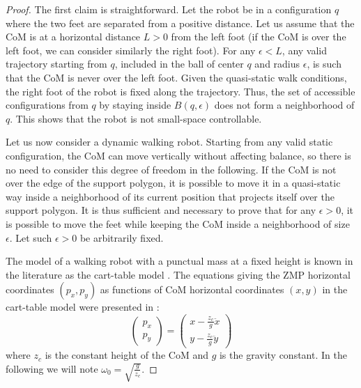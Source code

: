 \documentclass{article}
\begin{document}
\begin{proof}

The first claim is straightforward. Let the robot be in a configuration $q$ where the two
feet are separated from a positive distance. Let us assume that the CoM is at a horizontal
distance $L>0$ from the left foot (if the CoM is over the left foot, we can consider similarly 
the right foot). For any $\epsilon < L$, any valid trajectory starting from $q$, included in
the ball of center $q$ and radius $\epsilon$, is such that the CoM is never over the left foot.
Given the quasi-static walk conditions, the right foot of the robot is fixed along 
the trajectory. Thus, the set of accessible configurations from $q$ by staying inside 
$B(q,\epsilon)$ does not form a neighborhood of $q$. This shows that the robot is 
not small-space controllable.

\bigskip

Let us now consider a dynamic walking robot. Starting from any valid static configuration, 
the CoM can move vertically without affecting balance, so there is no need to 
consider this degree of freedom in the following. If the CoM is not over the edge of the support
polygon, it is possible to move it in a quasi-static way inside a neighborhood of its current position that projects itself over the support polygon. 
It is thus sufficient and necessary to prove that for any $\epsilon >0$, it is possible to move
the feet while keeping the CoM inside a neighborhood of size $\epsilon$. Let such $\epsilon >0$
be arbitrarily fixed.


The model of a walking robot with a punctual
mass at a fixed height is known in the literature as the cart-table model \cite{kajita2003biped}.
The equations  giving  the   ZMP  horizontal  coordinates  $(p_x,p_y)$  as
functions  of CoM  horizontal coordinates $(x,y)$  in the  cart-table  model were
presented in \cite{kajita2003biped}:
\begin{equation}
\label{eq:walk-zmp}
\left(
\begin{array}{c}
p_x\\ p_y
\end{array}
\right) = \displaystyle \left(
\begin{array}{c}
x - \frac{z_c}{g} \ddot{x}\\ y - \frac{z_c}{g} \ddot{y}
\end{array}
\right)
\end{equation}
where $z_c$ is  the constant height of the CoM and  $g$ is the gravity
constant.    In    the    following    we    will    note    $\omega_0
=\sqrt{\frac{g}{z_c}}$.


\end{proof}
\end{document}
